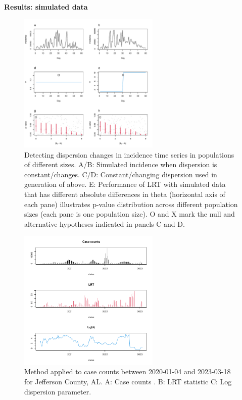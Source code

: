 \documentclass{beamer}
\begin{document}
\begin{frame}{\textbf{Results: simulated data}}
		\begin{figure}[!h]
			\includegraphics[width=0.6\textwidth]{fig1}
			\caption{
				Detecting dispersion changes in incidence time series in populations of different sizes. A/B: Simulated incidence when dispersion is constant/changes. C/D: Constant/changing dispersion used in generation of above. E: Performance of LRT with simulated data that has different absolute differences in theta (horizontal axis of each pane) illustrates p-value distribution across different population sizes (each pane is one population size). O and X mark the null and alternative hypotheses indicated in panels C and D. 
			}
			\label{fig1}
		\end{figure}
\end{frame}

\begin{frame}{\textbf{}}
		\begin{figure}[!h]
			\includegraphics[width=0.6\textwidth]{compare}
			\caption{
				Method applied to case counts between 2020-01-04 and 2023-03-18 for Jefferson County, AL. A: Case counts . B: LRT statistic C: Log dispersion parameter.
			}
			\label{fig2}
		\end{figure}
\end{frame}
\end{document}
